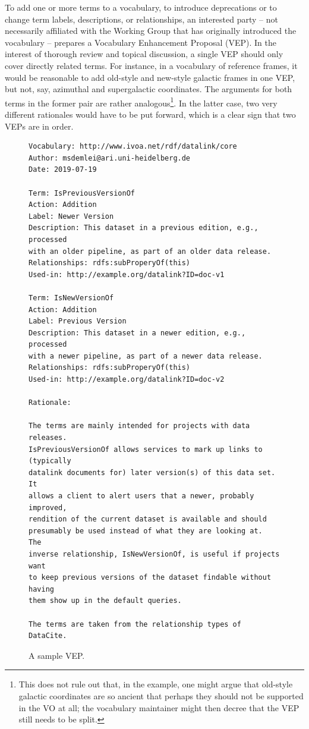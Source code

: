 \documentclass[11pt,a4paper]{ivoa}
\begin{document}
To add one or more terms to a vocabulary, to introduce deprecations or
to change term labels, descriptions, or relationships,
an interested party -- not necessarily affiliated with the Working Group
that has originally introduced the vocabulary -- prepares a Vocabulary
Enhancement Proposal (VEP).  In the interest of thorough review and
topical discussion, a single VEP should only cover directly related
terms.  For instance, in a vocabulary of reference frames, it would be
reasonable to add old-style and new-style galactic frames in one
VEP, but not, say, azimuthal and supergalactic coordinates.  The
arguments for both terms in the former pair are rather
analogous\footnote{This does not rule out that, in the example, one
might argue that old-style galactic coordinates are so ancient that
perhaps they should not be supported in the VO at all; the vocabulary
maintainer might then decree that the VEP still needs to be split.}.
In the latter case, two very different rationales would have
to be put forward, which is a clear sign that two VEPs are in order.

\begin{figure}
\begin{verbatim}
Vocabulary: http://www.ivoa.net/rdf/datalink/core
Author: msdemlei@ari.uni-heidelberg.de
Date: 2019-07-19

Term: IsPreviousVersionOf
Action: Addition
Label: Newer Version
Description: This dataset in a previous edition, e.g., processed 
with an older pipeline, as part of an older data release.
Relationships: rdfs:subProperyOf(this)
Used-in: http://example.org/datalink?ID=doc-v1

Term: IsNewVersionOf
Action: Addition
Label: Previous Version
Description: This dataset in a newer edition, e.g., processed
with a newer pipeline, as part of a newer data release.
Relationships: rdfs:subProperyOf(this)
Used-in: http://example.org/datalink?ID=doc-v2

Rationale: 

The terms are mainly intended for projects with data releases.
IsPreviousVersionOf allows services to mark up links to (typically
datalink documents for) later version(s) of this data set.  It
allows a client to alert users that a newer, probably improved,
rendition of the current dataset is available and should
presumably be used instead of what they are looking at.  The
inverse relationship, IsNewVersionOf, is useful if projects want
to keep previous versions of the dataset findable without having
them show up in the default queries. 

The terms are taken from the relationship types of DataCite.
\end{verbatim}

\caption{A sample VEP.}
\label{fig:vepsample}
\end{figure}
\end{document}
